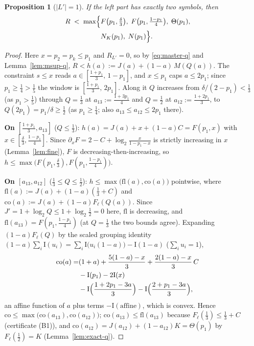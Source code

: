 \documentclass[journal]{IEEEtran}
\newtheorem{proposition}{Proposition}
\theoremstyle{definition}
\newcommand{\lgg}{\log_2}
\newcommand{\CC}{C}
\begin{document}
\begin{proposition}[$|L'|=1$]\label{prop:L1-q}
If the left part has exactly two symbols, then
\[
\begin{aligned}
  R\;<\;\max\Bigl\{&F\bigl(p_1,\tfrac{\delta}{3}\bigr),\;
  F\bigl(p_1,\tfrac{1-p_1}{4}\bigr),\;\Theta(p_1),\\
  &N_K(p_1),\;N(p_1)\Bigr\}.
\end{aligned}
\]
\end{proposition}

\begin{proof}
Here $x=p_2=p_k\le p_1$ and $R_{L'}=0$, so by \eqref{eq:master-q} and
Lemma~\ref{lem:msup-q}, $R<h(a):=J(a)+(1-a)\,M(Q(a))$. The constraint
$s\le x$ reads $a\in[\tfrac{1+p_1}3,\,1-p_1]$, and $x\le p_1$ caps
$a\le2p_1$; since $p_1\ge\tfrac14>\tfrac15$ the window is
$[\tfrac{1+p_1}3,\,2p_1]$. Along it $Q$ increases from
$\delta/(2-p_1)<\tfrac13$ \textup{(}as $p_1>\tfrac15$\textup{)} through
$Q=\tfrac13$ at $a_{13}:=\tfrac{1+3p_1}4$ and $Q=\tfrac12$ at
$a_{12}:=\tfrac{1+2p_1}3$, to $Q(2p_1)=p_1/\delta\ge\tfrac12$
\textup{(}as $p_1\ge\tfrac14$; also $a_{13}\le a_{12}\le 2p_1$
there\textup{)}.

\textbf{On $[\tfrac{1+p_1}3,a_{13}]$} ($Q\le\tfrac13$):
$h(a)=J(a)+x+(1-a)\CC=F(p_1,x)$ with $x\in[\tfrac\delta3,\tfrac{1-p_1}4]$.
Since $\partial_xF=2-\CC+\lgg\tfrac{x}{1-p_1-x}$ is strictly increasing in
$x$ (Lemma~\ref{lem:fine}), $F$ is decreasing-then-increasing, so
$h\le\max\bigl(F(p_1,\tfrac\delta3),F(p_1,\tfrac{1-p_1}4)\bigr)$.

\textbf{On $[a_{13},a_{12}]$} ($\tfrac13\le Q\le\tfrac12$):
$h\le\max\bigl(\mathrm{fl}(a),\mathrm{co}(a)\bigr)$ pointwise, where
$\mathrm{fl}(a):=J(a)+(1-a)(\tfrac13+\CC)$ and
$\mathrm{co}(a):=J(a)+(1-a)F_\ell(Q(a))$. Since
$J'=1+\lgg Q\le1+\lgg\tfrac12=0$ here, $\mathrm{fl}$ is decreasing, and
$\mathrm{fl}(a_{13})=F(p_1,\tfrac{1-p_1}4)$ \textup{(}at $Q=\tfrac13$
the two bounds agree\textup{)}. Expanding $(1-a)F_\ell(Q)$ by the scaled
grouping identity $(1-a)\sum_i \mathrm I(u_i)=\sum_i \mathrm I\bigl(u_i(1-a)\bigr)
-\mathrm I(1-a)$ \textup{(}$\sum_i u_i=1$\textup{)},
\[
  \begin{aligned}
  \mathrm{co}(a)=&(1+a)+\frac{5(1-a)-x}{3}
  +\frac{2(1-a)-x}{3}\,\CC\\
  &-\mathrm I(p_1)-2\mathrm I(x)\\
  &-\mathrm I\Bigl(\frac{1+2p_1-3a}{3}\Bigr)
  -\mathrm I\Bigl(\frac{2+p_1-3a}{3}\Bigr),
  \end{aligned}
\]
an affine function of $a$ plus terms $-\mathrm I(\text{affine})$, which is
convex. Hence
$\mathrm{co}\le\max\bigl(\mathrm{co}(a_{13}),\mathrm{co}(a_{12})\bigr)$;
$\mathrm{co}(a_{13})\le\mathrm{fl}(a_{13})$ because
$F_\ell(\tfrac13)\le\tfrac13+\CC$ \textup{(}certificate
\textup{(B1)}\textup{)}, and
$\mathrm{co}(a_{12})=J(a_{12})+(1-a_{12})K=\Theta(p_1)$ by
$F_\ell(\tfrac12)=K$ \textup{(}Lemma~\ref{lem:exact-q}\textup{)}.


\end{proof}
\end{document}
